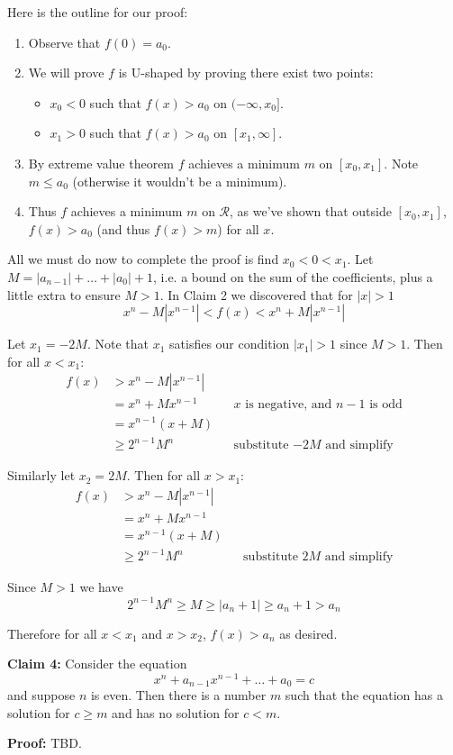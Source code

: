\vs

Here is the outline for our proof:

\begin{enumerate}
\item Observe that $f(0)=a_0$.
\item We will prove $f$ is U-shaped by proving there exist two points:
  \begin{itemize}
  \item $x_0<0$ such that $f(x)>a_0$ on $(-\infty, x_0]$.
  \item $x_1>0$ such that $f(x)>a_0$ on $[x_1, \infty]$.
  \end{itemize}
\item By extreme value theorem $f$ achieves a minimum $m$ on
  $[x_0, x_1]$. Note $m\leq a_{0}$ (otherwise it wouldn't be a minimum).
\item Thus $f$ achieves a minimum $m$ on $\mathcal{R}$, as we've shown that
  outside $[x_0, x_1]$, $f(x)>a_{0}$ (and thus $f(x)>m$) for all $x$.
\end{enumerate}

All we must do now to complete the proof is find $x_0<0<x_1$. Let
$M=|a_{n-1}|+\ldots+|a_0|+1$, i.e. a bound on the sum of the coefficients,
plus a little extra to ensure $M>1$. In Claim 2 we discovered that for
$|x|>1$
\[x^{n}-M|x^{n-1}|<f(x)<x^{n}+M|x^{n-1}|\]

Let $x_1=-2M$. Note that $x_1$ satisfies our condition $|x_1|>1$ since
$M>1$. Then for all $x<x_1$:
\begin{align*}
  f(x)&>x^{n}-M|x^{n-1}|\\
      &=x^n+Mx^{n-1}&&\text{$x$ is negative, and $n-1$ is odd}\\
      &=x^{n-1}(x+M)\\
      &\geq 2^{n-1}M^n&&\text{substitute $-2M$ and simplify}
\end{align*}

Similarly let $x_2=2M$. Then for all $x>x_1$:
\begin{align*}
  f(x)&>x^{n}-M|x^{n-1}|\\
      &=x^n+Mx^{n-1}\\
      &=x^{n-1}(x+M)\\
      &\geq 2^{n-1}M^n&&\text{substitute $2M$ and simplify}
\end{align*}

Since $M>1$ we have
\[2^{n-1}M^n\geq M\geq |a_n+1|\geq a_n+1>a_n\]

Therefore for all $x<x_1$ and $x>x_2$, $f(x)>a_{n}$ as desired.

\vs

\textbf{Claim 4:} Consider the equation
\[x^{n}+a_{n-1}x^{n-1}+\ldots+a_{0}=c\]
and suppose $n$ is even. Then there is a number $m$ such that the
equation has a solution for $c\geq m$ and has no solution for $c<m$.

\vs

\textbf{Proof:} TBD.

\vs



